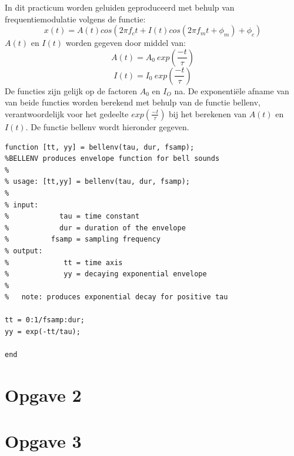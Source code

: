 \documentclass{article}
\begin{document}
In dit practicum worden geluiden geproduceerd met behulp van frequentiemodulatie volgens de functie:
$$x(t) = A(t)cos(2 \pi f_c t + I(t)cos(2 \pi f_m t + \phi_m) + \phi_c)$$
$A(t)$ en $I(t)$ worden gegeven door middel van:
$$A(t) = A_0~exp(\frac{-t}{\tau})$$
$$I(t) = I_0~exp(\frac{-t}{\tau})$$
De functies zijn gelijk op de factoren $A_0$ en $I_O$ na. De  exponenti\"ele afname van van beide functies worden berekend met behulp van de functie bellenv, verantwoordelijk voor het gedeelte $exp(\frac{-t}{\tau})$ bij het berekenen van $A(t)$ en $I(t)$. De functie bellenv wordt hieronder gegeven.

\begin{lstlisting}
function [tt, yy] = bellenv(tau, dur, fsamp);
%BELLENV produces envelope function for bell sounds
%
% usage: [tt,yy] = bellenv(tau, dur, fsamp);
%
% input:
%            tau = time constant
%            dur = duration of the envelope
%          fsamp = sampling frequency
% output:
%             tt = time axis
%             yy = decaying exponential envelope
%
%   note: produces exponential decay for positive tau

tt = 0:1/fsamp:dur;
yy = exp(-tt/tau);

end
\end{lstlisting}

\section{Opgave 2}


\section{Opgave 3}
\end{document}
